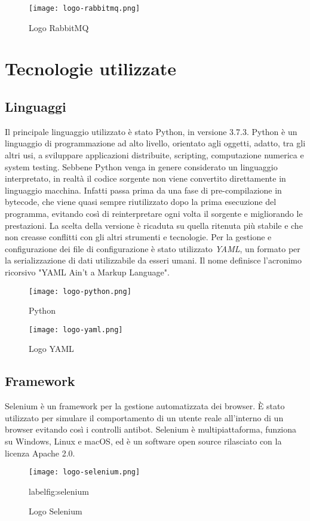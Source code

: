 \begin{figure}[!h] 
    \centering 
    \texttt{[image: logo-rabbitmq.png]} 
    \caption{Logo RabbitMQ}
    \label{fig:rabbitmq} 
\end{figure}

\section{Tecnologie utilizzate}

\subsection{Linguaggi}
Il principale linguaggio utilizzato è stato Python, in versione 3.7.3. Python è un linguaggio di programmazione ad alto livello, orientato agli oggetti, adatto, tra gli altri usi, a sviluppare applicazioni distribuite, scripting, computazione numerica e system testing. Sebbene Python venga in genere considerato un linguaggio interpretato, in realtà il codice sorgente non viene convertito direttamente in linguaggio macchina. Infatti passa prima da una fase di pre-compilazione in bytecode, che viene quasi sempre riutilizzato dopo la prima esecuzione del programma, evitando così di reinterpretare ogni volta il sorgente e migliorando le prestazioni. La scelta della versione è ricaduta su quella ritenuta più stabile e che non creasse conflitti con gli altri strumenti e tecnologie.\newline{}
Per la gestione e configurazione dei file di configurazione è stato utilizzato \textit{YAML}, un formato per la serializzazione di dati utilizzabile da esseri umani. Il nome definisce l'acronimo ricorsivo "YAML Ain't a Markup Language".
\begin{figure}[!h]
    \begin{minipage}{.5\textwidth} 
        \centering 
        \texttt{[image: logo-python.png]} 
        \caption{Python} 
        \label{fig:python} 
    \end{minipage}%
    \begin{minipage}{.5\textwidth} 
        \centering 
        \texttt{[image: logo-yaml.png]} 
        \caption{Logo YAML} 
        \label{fig:yaml} 
    \end{minipage}%
\end{figure}
\subsection{Framework}
Selenium è un framework per la gestione automatizzata dei browser. È stato utilizzato per simulare il comportamento di un utente reale all'interno di un browser evitando così i controlli antibot. Selenium è multipiattaforma, funziona su Windows, Linux e macOS, ed è un software open source rilasciato con la licenza Apache 2.0.
\begin{figure}[!h] 
    \centering 
    \texttt{[image: logo-selenium.png]} 
    \caption{Logo Selenium}
    label{fig:selenium} 
\end{figure}

